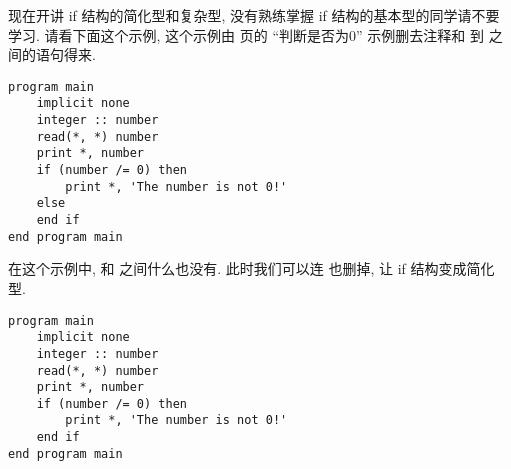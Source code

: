 现在开讲 if 结构的简化型和复杂型, 没有熟练掌握 if 结构的基本型的同学请不要学习. 请看下面这个示例, 这个示例由 \pageref{whether_zero} 页的 ``判断是否为0'' 示例删去注释和  到  之间的语句得来.
\begin{lstlisting}
program main
    implicit none
    integer :: number
    read(*, *) number
    print *, number
    if (number /= 0) then
        print *, 'The number is not 0!'
    else
    end if
end program main
\end{lstlisting}
在这个示例中,  和  之间什么也没有. 此时我们可以连  也删掉, 让 if 结构变成简化型.
\begin{lstlisting}
program main
    implicit none
    integer :: number
    read(*, *) number
    print *, number
    if (number /= 0) then
        print *, 'The number is not 0!'
    end if
end program main
\end{lstlisting}

